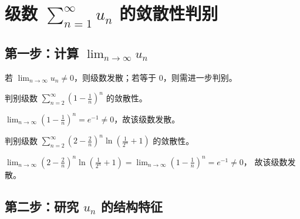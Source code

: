 
\section{级数 $\sum_{n=1}^{\infty} u_n$ 的敛散性判别}

\subsection{第一步：计算 $\displaystyle \lim_{n \to \infty} u_n$}

若 $\lim_{n \to \infty} u_n \neq 0$，则级数发散；若等于 0，则需进一步判别。

\begin{example}{}{}
    判别级数 $\displaystyle \sum_{n=2}^{\infty} \left(1-\frac{1}{n}\right)^n$ 的敛散性。
\end{example}
\begin{solution}
    $\displaystyle \lim_{n\to\infty}\left(1-\frac{1}{n}\right)^n=e^{-1}\neq0$，故该级数发散。
\end{solution}

\begin{example}{}{}
    判别级数 $\displaystyle \sum_{n=2}^{\infty}\left(2-\frac{2}{n}\right)^n\ln\left(\frac{1}{2^n}+1\right)$ 的敛散性。
\end{example}
\begin{solution}
    $\displaystyle \lim_{n\to\infty}\left(2-\frac{2}{n}\right)^n\ln\left(\frac{1}{2^n}+1\right)
        =\lim_{n\to\infty}\left(1-\frac{1}{n}\right)^n=e^{-1}\neq0$，
    故该级数发散。
\end{solution}


\subsection{第二步：研究 $u_n$ 的结构特征}

